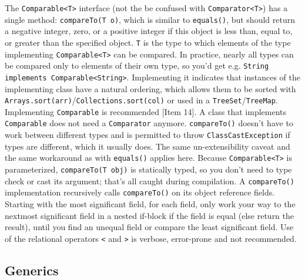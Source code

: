 \documentclass[table, xcdraw]{article}%
\begin{document}
The \texttt{Comparable<T>} interface (not the be confused with \texttt{Comparator<T>}) has a single method: \texttt{compareTo(T o)}, which is similar to \texttt{equals()}, but should return a negative integer, zero, or a positive integer if this object is less than, equal to, or greater than the specified object. \texttt{T} is the type to which elements of the type implementing \texttt{Comparable<T>} can be compared. In practice, nearly all types can be compared only to elements of their own type, so you'd get e.g. \texttt{String implements Comparable<String>}. Implementing it indicates that instances of the implementing class have a natural ordering, which allows them to be sorted with \texttt{Arrays.sort(arr)}/\texttt{Collections.sort(col)} or used in a \texttt{TreeSet}/\texttt{TreeMap}. Implementing \texttt{Comparable} is recommended [Item 14]. A class that implements \texttt{Comparable} does not need a \texttt{Comparator} anymore. \texttt{compareTo()} doesn't have to work between different types and is permitted to throw \texttt{ClassCastException} if types are different, which it usually does. The same un-extensibility caveat and the same workaround as with \texttt{equals()} applies here. Because \texttt{Comparable<T>} is parameterized, \texttt{compareTo(T obj)} is statically typed, so you don't need to type check or cast its argument; that's all caught during compilation. A \texttt{compareTo()} implementation recursively calls \texttt{compareTo()} on its object reference fields. Starting with the most significant field, for each field, only work your way to the nextmost significant field in a nested if-block if the field is equal (else return the result), until you find an unequal field or compare the least significant field. Use of the relational operators \texttt{<} and \texttt{>} is verbose, error-prone and not recommended.

\subsection{Generics}
\end{document}
